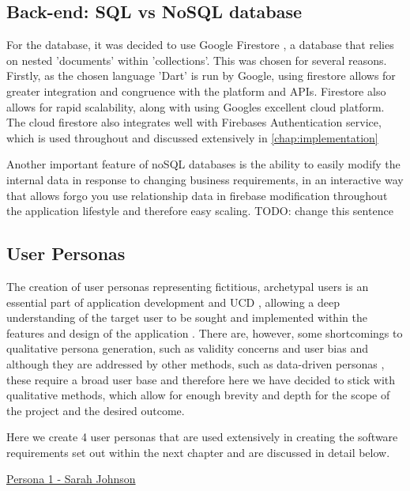 \documentclass[12pt]{article}
\begin{document}
	\subsection{Back-end: SQL vs NoSQL database}
	For the database, it was decided to use Google Firestore \cite{CloudFirestoreFirebase}, a  database that relies on  nested 'documents' within 'collections'. This was chosen for several reasons. Firstly, as the chosen language 'Dart' is run by Google, using firestore allows for greater integration and congruence with the platform and APIs. Firestore also allows for rapid scalability, along with using Googles excellent cloud platform. The cloud firestore also integrates well with Firebases Authentication service, which is used throughout and discussed extensively in \autoref{chap:implementation}
	
	Another important feature of noSQL databases is the ability to easily modify the internal data in response to changing business requirements, in an interactive way that allows forgo you use relationship data in firebase modification throughout the application lifestyle and therefore easy scaling. TODO: change this sentence

	\subsection{User Personas}
	\label{user-personas}
	The creation of user personas representing fictitious, archetypal users is an essential part of application development and UCD \cite{PDFPersonasParticipatory}, allowing a deep understanding of the target user to be sought and implemented within the features and design of the application \cite{arnowitzChapter15Wireframe2007}. There are, however, some shortcomings to qualitative persona generation, such as validity concerns and user bias \cite{chapmanPersonasNewClothes2005} and although they are addressed by other methods, such as data-driven personas \cite{mcginnDatadrivenPersonaDevelopment2008}, these require a broad user base and therefore here we have decided to stick with qualitative methods, which allow for enough brevity and depth for the scope of the project and the desired outcome.
	
	Here we create 4 user personas that are used extensively in creating the software requirements set out within the next chapter and are discussed in detail below.
	\newline
	
		\underline{Persona 1 - Sarah Johnson}
		
\end{document}
